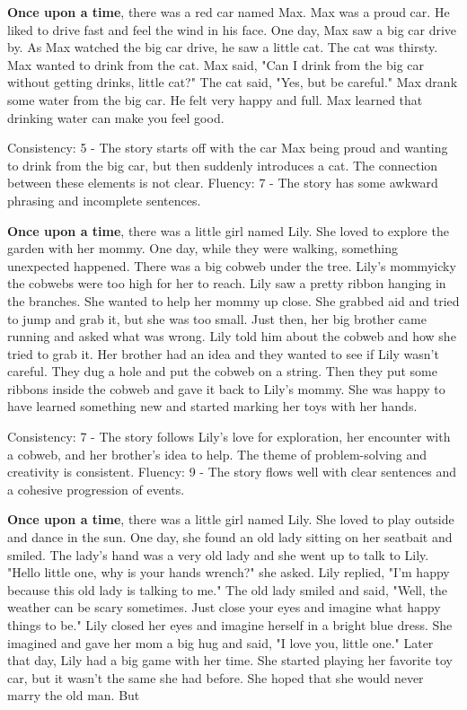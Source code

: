 \documentclass{article}
\begin{document}
\textbf{Once upon a time}, there was a red car named Max. Max was a proud car. He liked to drive fast and feel the wind in his face. One day, Max saw a big car drive by. As Max watched the big car drive, he saw a little cat. The cat was thirsty. Max wanted to drink from the cat. Max said, "Can I drink from the big car without getting drinks, little cat?" The cat said, "Yes, but be careful." Max drank some water from the big car. He felt very happy and full. Max learned that drinking water can make you feel good.

Consistency: 5 - The story starts off with the car Max being proud and wanting to drink from the big car, but then suddenly introduces a cat. The connection between these elements is not clear.
Fluency: 7 - The story has some awkward phrasing and incomplete sentences.

\textbf{Once upon a time}, there was a little girl named Lily. She loved to explore the garden with her mommy. One day, while they were walking, something unexpected happened. There was a big cobweb under the tree. Lily's mommyicky the cobwebs were too high for her to reach. Lily saw a pretty ribbon hanging in the branches. She wanted to help her mommy up close. She grabbed aid and tried to jump and grab it, but she was too small. Just then, her big brother came running and asked what was wrong. Lily told him about the cobweb and how she tried to grab it. Her brother had an idea and they wanted to see if Lily wasn't careful. They dug a hole and put the cobweb on a string. Then they put some ribbons inside the cobweb and gave it back to Lily's mommy. She was happy to have learned something new and started marking her toys with her hands.

Consistency: 7 - The story follows Lily's love for exploration, her encounter with a cobweb, and her brother's idea to help. The theme of problem-solving and creativity is consistent.
Fluency: 9 - The story flows well with clear sentences and a cohesive progression of events.

\textbf{Once upon a time}, there was a little girl named Lily. She loved to play outside and dance in the sun. One day, she found an old lady sitting on her seatbait and smiled. The lady's hand was a very old lady and she went up to talk to Lily. "Hello little one, why is your hands wrench?" she asked. Lily replied, "I'm happy because this old lady is talking to me." The old lady smiled and said, "Well, the weather can be scary sometimes. Just close your eyes and imagine what happy things to be." Lily closed her eyes and imagine herself in a bright blue dress. She imagined and gave her mom a big hug and said, "I love you, little one." Later that day, Lily had a big game with her time. She started playing her favorite toy car, but it wasn't the same she had before. She hoped that she would never marry the old man. But
\end{document}

